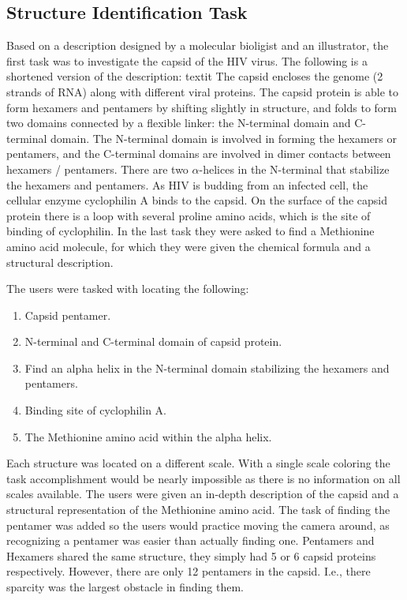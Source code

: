 \documentclass[review,journal]{vgtc}         %
\begin{document}
\subsection{Structure Identification Task}
Based on a description designed by a molecular bioligist and an illustrator, the first task was to investigate the capsid of the HIV virus. 
The following is a shortened version of the description:
textit{
The capsid encloses the genome (2 strands of RNA) along with different viral proteins. 
The capsid protein is able to form hexamers and pentamers by shifting slightly in structure, and folds to form two domains connected by a flexible linker: the N-terminal domain and C-terminal domain. 
The N-terminal domain is involved in forming the hexamers or pentamers, and the C-terminal domains are involved in dimer contacts between hexamers / pentamers. 
There are two $\alpha$-helices in the N-terminal that stabilize the hexamers and pentamers. 
As HIV is budding from an infected cell, the cellular enzyme cyclophilin A binds to the capsid. 
On the surface of the capsid protein there is a loop with several proline amino acids, which is the site of binding of cyclophilin.}
In the last task they were asked to find a Methionine amino acid molecule, for which they were given the chemical formula and a structural description.

The users were tasked with locating the following:

\begin{enumerate}
	\item Capsid pentamer.
	\item N-terminal and C-terminal domain of capsid protein.
	\item Find an alpha helix in the N-terminal domain stabilizing the hexamers and pentamers.
	\item Binding site of cyclophilin A.
	\item The Methionine amino acid within the alpha helix.
\end{enumerate}

Each structure was located on a different scale. With a single scale coloring the task accomplishment would be nearly impossible as there is no information on all scales available.
The users were given an in-depth description of the capsid and a structural representation of the Methionine amino acid. 
The task of finding the pentamer was added so the users would practice moving the camera around, as recognizing a pentamer was easier than actually finding one. 
Pentamers and Hexamers shared the same structure, they simply had 5 or 6 capsid proteins respectively. 
However, there are only 12 pentamers in the capsid.
I.e., there sparcity was the largest obstacle in finding them.
\end{document}
